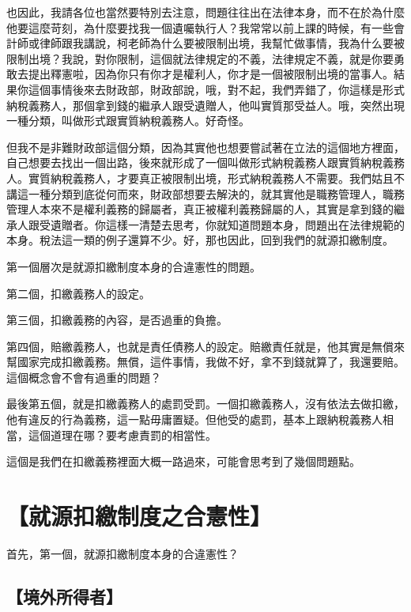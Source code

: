 \documentclass[]{ctexbook}
\begin{document}
也因此，我請各位也當然要特別去注意，問題往往出在法律本身，而不在於為什麼他要這麼苛刻，為什麼要找我一個遺囑執行人？我常常以前上課的時候，有一些會計師或律師跟我講說，柯老師為什么要被限制出境，我幫忙做事情，我為什么要被限制出境？我說，對你限制，這個就法律規定的不義，法律規定不義，就是你要勇敢去提出釋憲啦，因為你只有你才是權利人，你才是一個被限制出境的當事人。結果你這個事情後來去財政部，財政部說，哦，對不起，我們弄錯了，你這樣是形式納稅義務人，那個拿到錢的繼承人跟受遺贈人，他叫實質那受益人。哦，突然出現一種分類，叫做形式跟實質納稅義務人。好奇怪。

但我不是非難財政部這個分類，因為其實他也想要嘗試著在立法的這個地方裡面，自己想要去找出一個出路，後來就形成了一個叫做形式納稅義務人跟實質納稅義務人。實質納稅義務人，才要真正被限制出境，形式納稅義務人不需要。我們姑且不講這一種分類到底從何而來，財政部想要去解決的，就其實他是職務管理人，職務管理人本來不是權利義務的歸屬者，真正被權利義務歸屬的人，其實是拿到錢的繼承人跟受遺贈者。你這樣一清楚去思考，你就知道問題本身，問題出在法律規範的本身。稅法這一類的例子還算不少。好，那也因此，回到我們的就源扣繳制度。

第一個層次是就源扣繳制度本身的合違憲性的問題。

第二個，扣繳義務人的設定。

第三個，扣繳義務的內容，是否過重的負擔。

第四個，賠繳義務人，也就是責任債務人的設定。賠繳責任就是，他其實是無償來幫國家完成扣繳義務。無償，這件事情，我做不好，拿不到錢就算了，我還要賠。這個概念會不會有過重的問題？

最後第五個，就是扣繳義務人的處罰受罰。一個扣繳義務人，沒有依法去做扣繳，他有違反的行為義務，這一點毋庸置疑。但他受的處罰，基本上跟納稅義務人相當，這個道理在哪？要考慮責罰的相當性。

這個是我們在扣繳義務裡面大概一路過來，可能會思考到了幾個問題點。

\hypertarget{ux5c31ux6e90ux6263ux7e73ux5236ux5ea6ux4e4bux5408ux61b2ux6027}{%
\section{【就源扣繳制度之合憲性】}\label{ux5c31ux6e90ux6263ux7e73ux5236ux5ea6ux4e4bux5408ux61b2ux6027}}

首先，第一個，就源扣繳制度本身的合違憲性？

\hypertarget{ux5883ux5916ux6240ux5f97ux8005}{%
\subsection{【境外所得者】}\label{ux5883ux5916ux6240ux5f97ux8005}}
\end{document}
